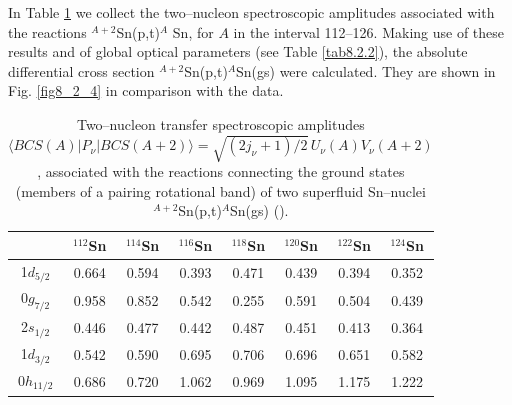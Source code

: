 In Table \ref{tab8_2_1} we collect the two--nucleon spectroscopic amplitudes associated with  the reactions  
$^{A+2}$Sn(p,t)$^A$ Sn, for $A$ in the interval 112--126. Making use of these results and of  global optical parameters (see Table \ref{tab8.2.2}), the absolute differential cross section $^{A+2}$Sn(p,t)$^A$Sn(gs) were calculated. They are shown in Fig. \ref{fig8_2_4} in comparison with the data.

\begin{table}[h!]
{\begin{tabular}{|c|c|c|c|c|c|c|c|}
\cline{1-8} 
& $^{112}$Sn & $^{114}$Sn&  $^{116}$Sn & $^{118}$Sn&  $^{120}$Sn &  $^{122}$Sn &  $^{124}$Sn          \\
\hline
1$d_{5/2}$            & 0.664      &  0.594   & 0.393    & 0.471      & 0.439     &  0.394    &  0.352                  \\
\hline 
0$g_{7/2}$            &  0.958     &  0.852  &  0.542     &  0.255   &  0.591      &  0.504  &   0.439                 \\
\hline 
2$s_{1/2}$            &  0.446    & 0.477    &  0.442    &  0.487     &  0.451   &  0.413     & 0.364                   \\
\hline 
1$d_{3/2}$            &  0.542    & 0.590   &  0.695    &  0.706     &  0.696   & 0.651   &   0.582                 \\
\hline 
0$h_{11/2}$            & 0.686     & 0.720    &  1.062     &  0.969     &  1.095   &  1.175    &   1.222                 \\
\hline 
\end{tabular}}
\caption{Two--nucleon transfer spectroscopic amplitudes \mbox{$\langle BCS(A)|P_{\nu}|BCS(A+2)\rangle=\sqrt{(2j_{\nu}+1)/2}\,U_{\nu}(A)V_{\nu}(A+2)$}, associated with the  reactions connecting the ground states (members of a pairing rotational band) of two superfluid Sn--nuclei $^{A+2}$Sn(p,t)$^A$Sn(gs) (\cite{Potel:13,Potel:13b}).}\label{tab8_2_1}
\end{table}


